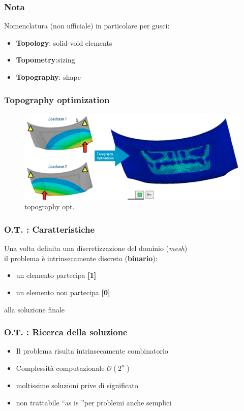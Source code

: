 \documentclass{beamer}
\begin{document}
\begin{frame}
	\frametitle{Nota}
	Nomenclatura (non ufficiale) in particolare per gusci: \\
	\begin{itemize}
		\item \textbf{Topology}: solid-void elements
		\item \textbf{Topometry}:sizing
		\item \textbf{Topography}: shape
	\end{itemize}
\end{frame}

\begin{frame}
	\frametitle{Topography optimization}
	\begin{figure}
		\includegraphics[width=0.9\linewidth]{./images/topography.png}
		\caption{topography opt.}
		\label{fig:topography}
	\end{figure}	
\end{frame}

\begin{frame}
	\frametitle{O.T. : Caratteristiche}
	Una volta definita una discretizzazione del dominio (\textit{mesh}) \\ il problema \`{e} intrinsecamente discreto (\textbf{binario}):
	\begin{itemize}
		\item un elemento partecipa \textbf{[1]}
		\item un elemento non partecipa \textbf{[0]}
	\end{itemize}
	alla soluzione finale
\end{frame}


\begin{frame}
	\frametitle{O.T. : Ricerca della soluzione}
	\begin{itemize}
		\item Il problema risulta intrinsecamente combinatorio
		\item Complessit\`{a} computazionale $\mathcal{O}(2^n)$
		\item moltissime soluzioni prive di significato
		\item non trattabile \textquotedblleft as is \textquotedblright per problemi anche semplici
	\end{itemize}
\end{frame}
\end{document}
